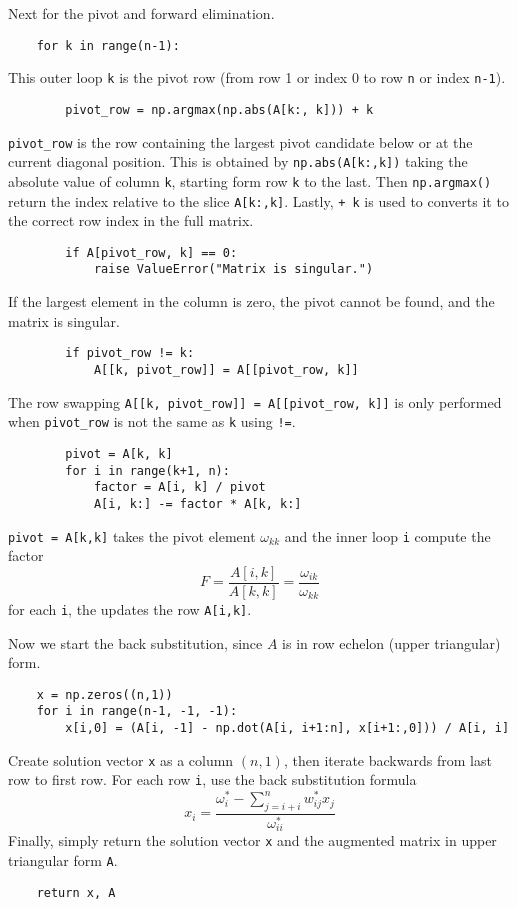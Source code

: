 \documentclass[../../../main.tex]{subfiles}
\begin{document}
Next for the pivot and forward elimination.
\begin{verbatim}
    for k in range(n-1):
\end{verbatim}
This outer loop \verb|k| is the pivot row (from row 1 or index 0 to row \verb|n| or index \verb|n-1|).
\begin{verbatim}
        pivot_row = np.argmax(np.abs(A[k:, k])) + k
\end{verbatim}
\verb|pivot_row| is the row containing the largest pivot candidate below or at the current diagonal position.
This is obtained by \verb|np.abs(A[k:,k])| taking the absolute value of column \verb|k|, starting form row \verb|k| to the last.
Then \verb|np.argmax()| return the index relative to the slice \verb|A[k:,k]|.
Lastly, \verb|+ k| is used to converts it to the correct row index in the full matrix.
\begin{verbatim}
        if A[pivot_row, k] == 0:
            raise ValueError("Matrix is singular.")
\end{verbatim}
If the largest element in the column is zero, the pivot cannot be found, and the matrix is singular.
\begin{verbatim}
        if pivot_row != k:
            A[[k, pivot_row]] = A[[pivot_row, k]]
\end{verbatim}
The row swapping \verb|A[[k, pivot_row]] = A[[pivot_row, k]]| is only performed when \verb|pivot_row| is not the same as \verb|k| using \verb|!=|.
\begin{verbatim}
        pivot = A[k, k]
        for i in range(k+1, n):
            factor = A[i, k] / pivot
            A[i, k:] -= factor * A[k, k:] 
\end{verbatim}
\verb|pivot = A[k,k]| takes the pivot element $\omega_{kk}$ and the inner loop \verb|i| compute the factor
\begin{equation*}
    F=\frac{A[i,k]}{A[k,k]}=\frac{\omega_{ik }}{\omega_{kk}}
\end{equation*}
for each \verb|i|, the updates the row \verb|A[i,k]|.

Now we start the back substitution, since $A$ is in row echelon (upper triangular) form.
\begin{verbatim}
    x = np.zeros((n,1))
    for i in range(n-1, -1, -1):
        x[i,0] = (A[i, -1] - np.dot(A[i, i+1:n], x[i+1:,0])) / A[i, i]
\end{verbatim}
Create solution vector \verb|x| as a column $(n,1)$, then iterate backwards from last row to first row.
For each row \verb|i|, use the back substitution formula
\begin{equation*}
    x_i =\frac{\omega_i ^* -\sum_{j=i+i }^{n }w_{ij}^*x_j}{\omega_{ii }^*}
\end{equation*}
Finally, simply return the solution vector \verb|x| and the augmented matrix in upper triangular form \verb|A|.
\begin{verbatim}
    return x, A    
\end{verbatim}
\end{document}
